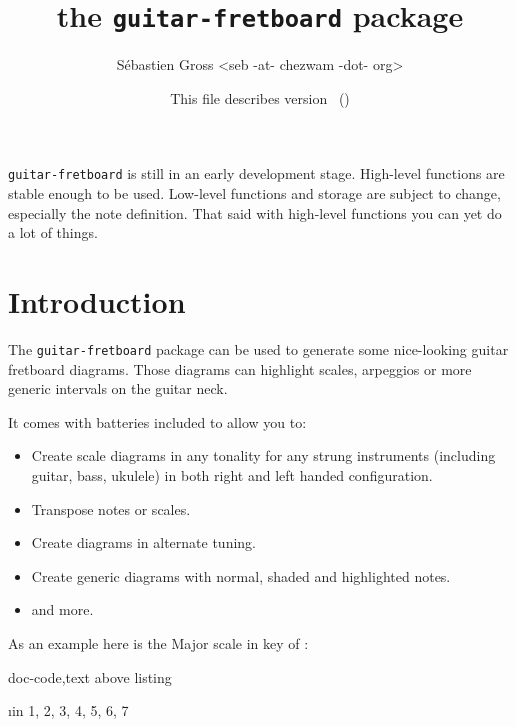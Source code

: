 \documentclass[a4paper]{article}
\newif\ifintroduction
\newcommand{\pkg}[1]{\texttt{#1}}
\begin{document}
\title{the \pkg{guitar-fretboard} package }
\author {Sébastien Gross <seb -at- chezwam -dot- org>}
\date{This file describes version \fbfileversion\  (\fbfiledate)}
\maketitle
\tableofcontents


\begin{tcolorbox}[warning,before={\vspace{1cm}}]
  \pkg{guitar-fretboard} is still in an early development stage. High-level
  functions are stable enough to be used. Low-level functions and storage
  are subject to change, especially the note definition. That said with
  high-level functions you can yet do a lot of things.
\end{tcolorbox}


\ifintroduction

\section{Introduction}

The \pkg{guitar-fretboard} package can be used to generate some nice-looking
guitar fretboard diagrams. Those diagrams can highlight scales, arpeggios or
more generic intervals on the guitar neck.

It comes with batteries included to allow you to:

\begin{itemize}
  \item Create scale diagrams in any tonality for any strung instruments
    (including guitar, bass, ukulele) in both right and left handed
    configuration.
  \item Transpose notes or scales.
  \item Create diagrams in alternate tuning.
  \item Create generic diagrams with normal, shaded and highlighted notes.
  \item and more.
\end{itemize}

As an example here is the Major scale in key of \pC:

\begin{tcblisting}{doc-code,text above listing}
  \begin{fretboard}[frets before = 2, frets after = 2,
      title = {Major scale (1, 2, 3, 4, 5, 6, 7)},
      scale=0.35, fret numbers]
    \foreach \i in {1, 2, 3, 4, 5, 6, 7} {
      \FBnote[split]{\i}
    }
  \end{fretboard}
\end{tcblisting}
\end{document}
